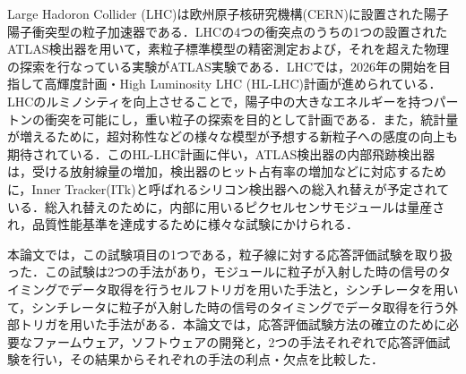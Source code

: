 Large Hadoron Collider (LHC)は欧州原子核研究機構(CERN)に設置された陽子陽子衝突型の粒子加速器である．LHCの4つの衝突点のうちの1つの設置されたATLAS検出器を用いて，素粒子標準模型の精密測定および，それを超えた物理の探索を行なっている実験がATLAS実験である．LHCでは，2026年の開始を目指して高輝度計画・High Luminosity LHC (HL-LHC)計画が進められている．LHCのルミノシティを向上させることで，陽子中の大きなエネルギーを持つパートンの衝突を可能にし，重い粒子の探索を目的として計画である．また，統計量が増えるために，超対称性などの様々な模型が予想する新粒子への感度の向上も期待されている．このHL-LHC計画に伴い，ATLAS検出器の内部飛跡検出器は，受ける放射線量の増加，検出器のヒット占有率の増加などに対応するために，Inner Tracker(ITk)と呼ばれるシリコン検出器への総入れ替えが予定されている．総入れ替えのために，内部に用いるピクセルセンサモジュールは量産され，品質性能基準を達成するために様々な試験にかけられる．\par
本論文では，この試験項目の1つである，粒子線に対する応答評価試験を取り扱った．この試験は2つの手法があり，モジュールに粒子が入射した時の信号のタイミングでデータ取得を行うセルフトリガを用いた手法と，シンチレータを用いて，シンチレータに粒子が入射した時の信号のタイミングでデータ取得を行う外部トリガを用いた手法がある．本論文では，応答評価試験方法の確立のために必要なファームウェア，ソフトウェアの開発と，2つの手法それぞれで応答評価試験を行い，その結果からそれぞれの手法の利点・欠点を比較した．





